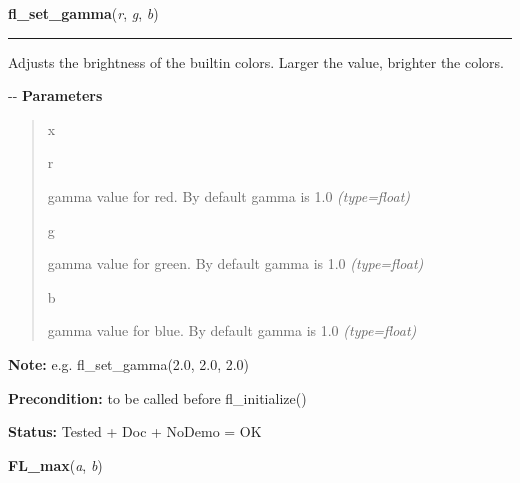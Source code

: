 \hspace{.8\funcindent}\begin{boxedminipage}{\funcwidth}

    \raggedright \textbf{fl\_set\_gamma}(\textit{r}, \textit{g}, \textit{b})

    \vspace{-1.5ex}

    \rule{\textwidth}{0.5\fboxrule}
\setlength{\parskip}{2ex}

Adjusts the brightness of the builtin colors. Larger the value,
brighter the colors.

-{}-
\setlength{\parskip}{1ex}
      \textbf{Parameters}
      \vspace{-1ex}

      \begin{quote}
        \begin{Ventry}{x}

          \item[r]


gamma value for red. By default gamma is 1.0
            {\it (type=float)}

          \item[g]


gamma value for green. By default gamma is 1.0
            {\it (type=float)}

          \item[b]


gamma value for blue. By default gamma is 1.0
            {\it (type=float)}

        \end{Ventry}

      \end{quote}

\textbf{Note:} 
e.g. fl\_set\_gamma(2.0, 2.0, 2.0)


\textbf{Precondition:} 
to be called before fl\_initialize()


\textbf{Status:} 
Tested + Doc + NoDemo = OK


    \end{boxedminipage}

    \label{xformslib:flbasic:FL_max}

    \vspace{0.5ex}

\hspace{.8\funcindent}\begin{boxedminipage}{\funcwidth}

    \raggedright \textbf{FL\_max}(\textit{a}, \textit{b})

\setlength{\parskip}{2ex}
\setlength{\parskip}{1ex}
    \end{boxedminipage}


